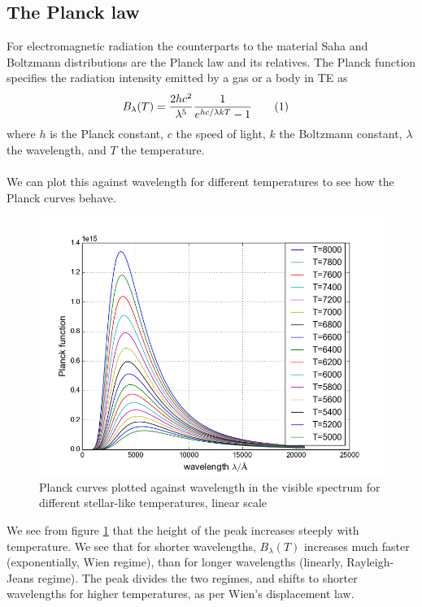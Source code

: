 \documentclass{article}
\newcommand\numberthis{\addtocounter{equation}{1}\tag{\theequation}}
\begin{document}
\subsection{The Planck law}
For electromagnetic radiation the counterparts to the material Saha and Boltzmann distributions are the Planck law and its relatives. The Planck function specifies the radiation intensity emitted by a gas or a body in TE as
\begin{align*}
  B_{\lambda}(T) &= \frac{2hc^2}{\lambda^5}\frac{1}{e^{hc/\lambda kT} - 1}\numberthis\label{eq:planck}
\end{align*}
where $h$ is the Planck constant, $c$ the speed of light, $k$ the Boltzmann constant, $\lambda$ the wavelength, and $T$ the temperature.
\\\\
We can plot this against wavelength for different temperatures to see how the Planck curves behave.
\begin{figure}[H]
  \centering
  \includegraphics[scale=0.5]{ssa_3_1.png}
  \caption{Planck curves plotted against wavelength in the visible spectrum for different stellar-like temperatures, linear scale}
  \label{fig:planck_linear}
\end{figure}
We see from figure \ref{fig:planck_linear} that the height of the peak increases steeply with temperature. We see that for shorter wavelengths, $B_{\lambda}(T)$ increases much faster (exponentially, Wien regime), than for longer wavelengths (linearly, Rayleigh-Jeans regime). The peak divides the two regimes, and shifts to shorter wavelengths for higher temperatures, as per Wien's displacement law.\\\\
\end{document}

